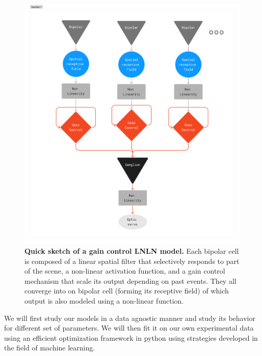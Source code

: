 \begin{figure}
    \centering
    \includegraphics[scale = 0.2]{pics/GCModelDiagram.png}
    \caption{\textbf{Quick sketch of a gain control LNLN model.} Each bipolar
        cell is
        composed of a linear spatial filter that selectively responds to part
        of the scene,
        a non-linear activation function, and a gain control mechanism that
        scale its output
        depending on past events. They all converge into on bipolar cell
        (forming its receptive field)
        of which output is also modeled using a non-linear function.}
    \label{fig:LNLN}
\end{figure}
We will first study our models in a data agnostic manner and study its behavior
for different set of parameters. We will then fit it on our own experimental
data using an efficient optimization framework in python using strategies
developed in the field of machine learning.